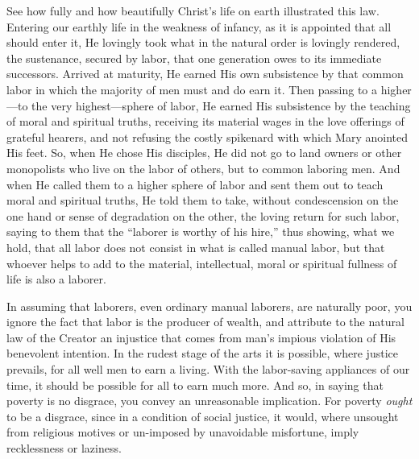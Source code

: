 \documentclass{book}
\begin{document}
See how fully and how beautifully Christ’s life on earth illustrated this law. Entering our earthly life in the weakness of infancy, as it is appointed that all should enter it, He lovingly took what in the natural order is lovingly rendered, the sustenance, secured by labor, that one generation owes to its immediate successors. Arrived at maturity, He earned His own subsistence by that common labor in which the majority of men must and do earn it. Then passing to a higher—to the very highest—sphere of labor, He earned His subsistence by the teaching of moral and spiritual truths, receiving its material wages in the love offerings of grateful hearers, and not refusing the costly spikenard with which Mary anointed His feet. So, when He chose His disciples, He did not go to land owners or other monopolists who live on the labor of others, but to common laboring men. And when He called them to a higher sphere of labor and sent them out to teach moral and spiritual truths, He told them to take, without condescension on the one hand or sense of degradation on the other, the loving return for such labor, saying to them that the “laborer is worthy of his hire,” thus showing, what we hold, that all labor does not consist in what is called manual labor, but that whoever helps to add to the material, intellectual, moral or spiritual fullness of life is also a laborer.\footnotemark[1]

In assuming that laborers, even ordinary manual laborers, are naturally poor, you ignore the fact that labor is the producer of wealth, and attribute to the natural law of the Creator an injustice that comes from man’s impious violation of His benevolent intention. In the rudest stage of the arts it is possible, where justice prevails, for all well men to earn a living. With the labor-saving appliances of our time, it should be possible for all to earn much more. And so, in saying that poverty is no disgrace, you convey an unreasonable implication. For poverty \emph{ought} to be a disgrace, since in a condition of social justice, it would, where unsought from religious motives or un-imposed by unavoidable misfortune, imply recklessness or laziness.
\end{document}
